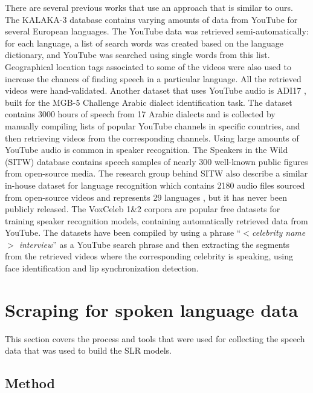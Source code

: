 \documentclass{article}
\begin{document}
There are several previous works that use an approach that is similar to ours. The KALAKA-3 database \cite{rodriguez2016kalaka} contains varying amounts of data from YouTube for several European languages. The YouTube data was retrieved semi-automatically: for each language, a list of search words was created based on the language dictionary, and YouTube was searched using single words from this list. Geographical location tags associated to some of the videos were also used to increase the chances of finding speech in a particular language. All the retrieved videos were hand-validated. Another dataset that uses YouTube audio is ADI17 \cite{shon2020adi17}, built for the MGB-5 Challenge \cite{ali2019mgb} Arabic dialect identification task. The dataset contains 3000 hours of speech from 17 Arabic dialects and is collected by manually compiling lists of popular YouTube channels in specific countries, and then retrieving videos from the corresponding channels. Using large amounts of YouTube audio is common in speaker recognition. The Speakers in the Wild (SITW) database \cite{mclaren2016speakers} contains speech samples of nearly 300 well-known public figures from open-source media. The research group behind SITW also describe a similar in-house dataset for language recognition which contains 2180 audio files sourced from open-source videos and represents 29 languages \cite{mclaren2018approaches}, but it has never been publicly released. The VoxCeleb 1\&2 \cite{nagrani2017voxceleb, Chung18b} corpora are popular free datasets for training speaker recognition models, containing automatically retrieved data from YouTube. The datasets have been compiled by using a phrase ``\textit{$<$celebrity name$>$ interview}'' as a YouTube search phrase and then extracting the segments from the retrieved videos where the corresponding celebrity is speaking, using face identification and lip synchronization detection. 


\section{Scraping for spoken language data}

This section covers the process and tools that were used for collecting the speech data that
was used to build the SLR models.

\subsection{Method}
\end{document}
